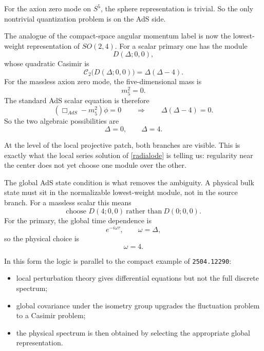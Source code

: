 \documentclass[12pt]{article}
\newcommand{\D}{\Delta}
\newcommand{\cC}{\mathcal{C}}
\begin{document}
For the axion zero mode on $S^5$, the sphere representation is trivial.  So the only nontrivial
quantization problem is on the AdS side.

The analogue of the compact-space angular momentum label is now the lowest-weight representation of
$SO(2,4)$.  For a scalar primary one has the module
\begin{equation}
D(\D;0,0),
\end{equation}
whose quadratic Casimir is
\begin{equation}
\cC_2\big(D(\D;0,0)\big)=\D(\D-4).
\label{casimir}
\end{equation}
For the massless axion zero mode, the five-dimensional mass is
\begin{equation}
m_5^2=0.
\end{equation}
The standard AdS scalar equation is therefore
\begin{equation}
\left(\Box_{AdS}-m_5^2\right)\phi=0
\qquad \Longrightarrow \qquad
\D(\D-4)=0.
\label{massdim}
\end{equation}
So the two algebraic possibilities are
\begin{equation}
\D=0,\qquad \D=4.
\end{equation}

At the level of the local projective patch, both branches are visible.  This is exactly what the local
series solution of \eqref{radialode} is telling us: regularity near the center does not yet choose one
module over the other.

The global AdS state condition is what removes the ambiguity.  A physical bulk state must sit in the
normalizable lowest-weight module, not in the source branch.  For a massless scalar this means
\begin{equation}
\text{choose } D(4;0,0)\ \text{rather than}\ D(0;0,0).
\end{equation}
For the primary, the global time dependence is
\begin{equation}
e^{-i\omega\tau},
\qquad
\omega=\D,
\end{equation}
so the physical choice is
\begin{equation}
\omega=4.
\end{equation}

In this form the logic is parallel to the compact example of \texttt{2504.12290}:
\begin{itemize}
\item local perturbation theory gives differential equations but not the full discrete spectrum;
\item global covariance under the isometry group upgrades the fluctuation problem to a Casimir problem;
\item the physical spectrum is then obtained by selecting the appropriate global representation.
\end{itemize}
\end{document}
